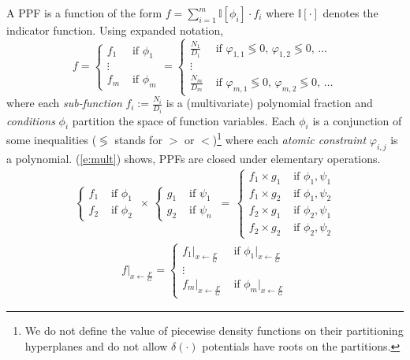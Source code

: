 \documentclass[letterpaper]{article}
\newcommand{\indicator}{\mathbb{I}}%
\newcommand{\case}[2]{#2 &\text{ if } #1}%
\begin{document}
A PPF is a function of the form
$f = \sum_{i=1}^m \indicator[\phi_i]\cdot f_i $ where $\indicator[\cdot]$ denotes the indicator function.
Using expanded notation, 
{\footnotesize
\begin{equation}
\label{e:ppf}
f =
  \begin{cases}
  \case{\phi_1}{f_1}\\
\vdots\\
  \case{\phi_m}{f_m}    
  \end{cases}
\!\!=
  \begin{cases}
  \case{\varphi_{1,1} \lessgtr 0,\, \varphi_{1,2} \lessgtr 0,\, \ldots}{\frac{N_1}{D_1}} \\
\vdots\\
   \case{\varphi_{m,1} \lessgtr 0,\, \varphi_{m,2} \lessgtr 0,\, \ldots}{\frac{N_m}{D_m}}    
  \end{cases}
\end{equation}
}
where each \emph{sub-function} $f_i := \frac{N_i}{D_i}$ is a (multivariate) polynomial fraction and
\emph{conditions} $\phi_i$ partition the space of function variables. 
Each $\phi_i$ is a conjunction of some inequalities ($\lessgtr$ stands for  
$>$ or $<$)\footnote{
We do not define the value of piecewise density functions on their partitioning hyperplanes and do not allow $\delta(\cdot)$ potentials have roots on the partitions. 
} 
where each \emph{atomic constraint} $\varphi_{i,j}$ is a polynomial.
(\ref{e:mult}) shows, PPFs are closed under elementary operations. 
\\
{\footnotesize
\begin{align}\label{e:mult}
\begin{cases}
  \case{\phi_1}{f_1}\\
  \case{\phi_2}{f_2}    
  \end{cases}
\,
 \times
\,
  \begin{cases}
  \case{\psi_1}{g_1} \\
  \case{\psi_n}{g_2} 
  \end{cases}
 \, = \,
\begin{cases}
  \case{\phi_1, \psi_1}{f_1 \times g_1} \\ 
  \case{\phi_1, \psi_2}{f_1 \times g_2} \\
  \case{\phi_2, \psi_1}{f_2 \times g_1} \\
  \case{\phi_2, \psi_2}{f_2 \times g_2}
  \end{cases}
\end{align} 
\begin{align}\label{e:substitute}
f|_{x \leftarrow \frac{F}{G}}
=
\begin{cases}
  \case{{\phi_1}|_{x \leftarrow \frac{F}{G}}}{{f_1}|_{x \leftarrow \frac{F}{G}}}\\
\vdots\\
  \case{{\phi_m}|_{x \leftarrow \frac{F}{G}}}{{f_m}|_{x \leftarrow \frac{F}{G}}}    
  \end{cases}
\end{align} 
}
\end{document}
